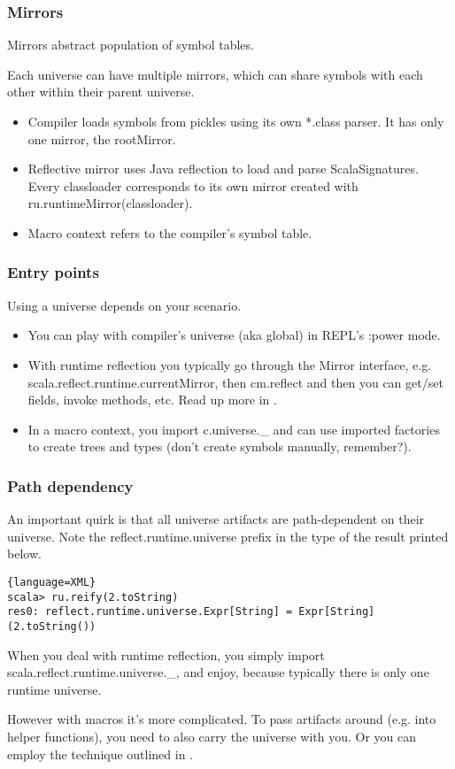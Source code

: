 \documentclass[hyperref={bookmarks=false}]{beamer}
\begin{document}
\begin{frame}[fragile]
\frametitle{Mirrors}

Mirrors abstract population of symbol tables.

Each universe can have multiple mirrors, which can share symbols with each other within their parent universe.

\begin{itemize}
\item Compiler loads symbols from pickles using its own *.class parser. It has only one mirror, the rootMirror.
\item Reflective mirror uses Java reflection to load and parse ScalaSignatures. Every classloader corresponds to its own mirror created with ru.runtimeMirror(classloader).
\item Macro context refers to the compiler's symbol table.
\end{itemize}
\end{frame}

\begin{frame}[fragile]
\frametitle{Entry points}

Using a universe depends on your scenario.

\begin{itemize}
\item You can play with compiler's universe (aka global) in REPL's :power mode.
\item With runtime reflection you typically go through the Mirror
interface, e.g. scala.reflect.runtime.currentMirror, then cm.reflect and then you can get/set fields, invoke methods, etc. Read up more in .
\item In a macro context, you import c.universe.\_ and can use imported factories to create trees and types (don't create symbols manually, remember?).
\end{itemize}
\end{frame}

\begin{frame}[fragile]
\frametitle{Path dependency}

An important quirk is that all universe artifacts are path-dependent on their universe.
Note the reflect.runtime.universe prefix in the type of the result printed below.

\begin{lstlisting}{language=XML}
scala> ru.reify(2.toString)
res0: reflect.runtime.universe.Expr[String] = Expr[String](2.toString())
\end{lstlisting}

When you deal with runtime reflection, you simply import scala.reflect.runtime.universe.\_, and enjoy,
because typically there is only one runtime universe.

However with macros it's more complicated. To pass artifacts around (e.g. into helper functions),
you need to also carry the universe with you. Or you can employ the technique outlined in
.
\end{frame}
\end{document}
